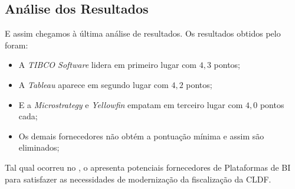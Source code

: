 \subsection*{Análise dos Resultados} 

    E assim chegamos à última análise de resultados. Os resultados obtidos pelo \cenFC \xspace foram:
    
    \begin{itemize}
        \item A \emph{TIBCO Software} lidera em primeiro lugar com $4,3$ pontos;
        \item A \emph{Tableau} aparece em segundo lugar com $4,2$ pontos;
        \item E a \emph{Microstrategy} e \emph{Yellowfin} empatam em terceiro lugar com $4,0$ pontos cada;
        \item Os demais fornecedores não obtém a pontuação mínima e assim são eliminados;
    \end{itemize}
    
    Tal qual ocorreu no \cenGC, o \cenFC \xspace apresenta potenciais fornecedores de Plataformas de BI para satisfazer as necessidades de modernização da fiscalização da CLDF.